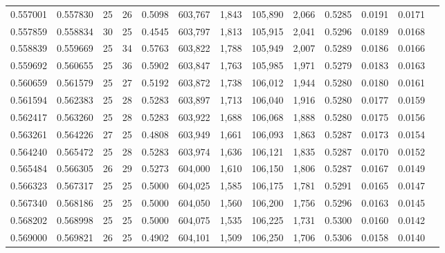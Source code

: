 \begin{tabular}{rrrrrrrrrrrrr}
0.557001 & 0.557830 &    25 &  26 &                                     0.5098 & 603,767 &   1,843 & 105,890 &   2,066 & 0.5285 & 0.0191 & 0.0171 \\
0.557859 & 0.558834 &    30 &  25 &                                     0.4545 & 603,797 &   1,813 & 105,915 &   2,041 & 0.5296 & 0.0189 & 0.0168 \\
0.558839 & 0.559669 &    25 &  34 &                                     0.5763 & 603,822 &   1,788 & 105,949 &   2,007 & 0.5289 & 0.0186 & 0.0166 \\
0.559692 & 0.560655 &    25 &  36 &                                     0.5902 & 603,847 &   1,763 & 105,985 &   1,971 & 0.5279 & 0.0183 & 0.0163 \\
0.560659 & 0.561579 &    25 &  27 &                                     0.5192 & 603,872 &   1,738 & 106,012 &   1,944 & 0.5280 & 0.0180 & 0.0161 \\
0.561594 & 0.562383 &    25 &  28 &                                     0.5283 & 603,897 &   1,713 & 106,040 &   1,916 & 0.5280 & 0.0177 & 0.0159 \\
0.562417 & 0.563260 &    25 &  28 &                                     0.5283 & 603,922 &   1,688 & 106,068 &   1,888 & 0.5280 & 0.0175 & 0.0156 \\
0.563261 & 0.564226 &    27 &  25 &                                     0.4808 & 603,949 &   1,661 & 106,093 &   1,863 & 0.5287 & 0.0173 & 0.0154 \\
0.564240 & 0.565472 &    25 &  28 &                                     0.5283 & 603,974 &   1,636 & 106,121 &   1,835 & 0.5287 & 0.0170 & 0.0152 \\
0.565484 & 0.566305 &    26 &  29 &                                     0.5273 & 604,000 &   1,610 & 106,150 &   1,806 & 0.5287 & 0.0167 & 0.0149 \\
0.566323 & 0.567317 &    25 &  25 &                                     0.5000 & 604,025 &   1,585 & 106,175 &   1,781 & 0.5291 & 0.0165 & 0.0147 \\
0.567340 & 0.568186 &    25 &  25 &                                     0.5000 & 604,050 &   1,560 & 106,200 &   1,756 & 0.5296 & 0.0163 & 0.0145 \\
0.568202 & 0.568998 &    25 &  25 &                                     0.5000 & 604,075 &   1,535 & 106,225 &   1,731 & 0.5300 & 0.0160 & 0.0142 \\
0.569000 & 0.569821 &    26 &  25 &                                     0.4902 & 604,101 &   1,509 & 106,250 &   1,706 & 0.5306 & 0.0158 & 0.0140 \\

\end{tabular}
